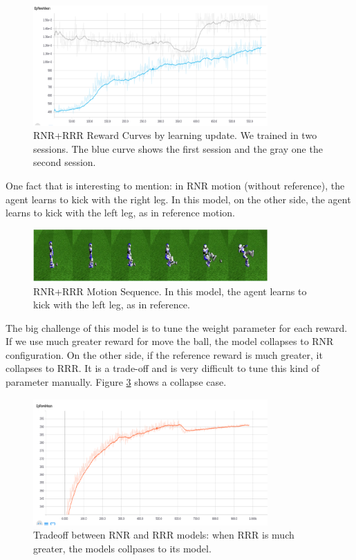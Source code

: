 \begin{figure}[!htbp]
	\centering
	\includegraphics[width=0.8\textwidth]{Cap6/rnrrrrrewardcurve.eps}
	\caption{RNR+RRR Reward Curves by learning update. We trained in two sessions. The blue curve shows the first session and the gray one the second session.}
	\label{fig:rnrrrrrewardcurve}
\end{figure}

One fact that is interesting to mention: in RNR motion (without reference), the agent learns to kick with the right leg. In this model, on the other side, the agent learns to kick with the left leg, as in reference motion.

\begin{figure}[!htbp]
	\centering
	\includegraphics[width=0.8\textwidth]{Cap6/rnrrrrreward.eps}
	\caption{RNR+RRR Motion Sequence. In this model, the agent learns to kick with the left leg, as in reference.}
	\label{fig:rnrrrrreward}
\end{figure}


The big challenge of this model is to tune the weight parameter for each reward. If we use much greater reward for move the ball, the model collapses to RNR configuration. On the other side, if the reference reward is much greater, it collapses to RRR. It is a trade-off and is very difficult to tune this kind of parameter manually. Figure \ref{fig:rnrrrrtradeoff} shows a collapse case.


\begin{figure}[!htbp]
	\centering
	\includegraphics[width=0.8\textwidth]{Cap6/rnrrrrtradeoff.eps}
	\caption{Tradeoff between RNR and RRR models: when RRR is much greater, the models collpases to its model.}
	\label{fig:rnrrrrtradeoff}
\end{figure}

